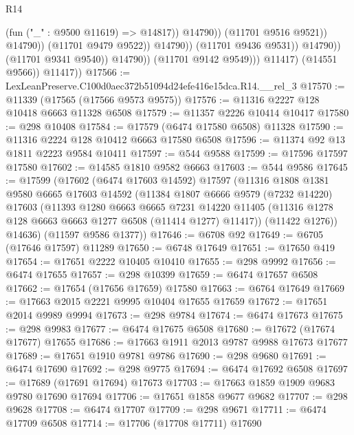 \begin{lexlean}{R14}
\begin{coremodule}
                                              (fun ("_" : @9500 @11619) => @14817))
                                            @14790))
                                        (@11701 @9516 @9521))
                                      @14790))
                                  (@11701 @9479 @9522))
                                @14790))
                            (@11701 @9436 @9531))
                          @14790))
                      (@11701 @9341 @9540))
                    @14790))
                (@11701 @9142 @9549)))
            @11417)
          (@14551 @9566))
        @11417))
@17566 := LexLeanPreserve.C100d0aec372b51094d24efe416e15dca.R14.__rel_3
@17570 := @11339 (@17565 (@17566 @9573 @9575))
@17576 := @11316 @2227 @128 @10418 @6663 @11328 @6508
@17579 := @11357 @2226 @10414 @10417
@17580 := @298 @10408
@17584 := @17579 (@6474 @17580 @6508) @11328
@17590 := @11316 @2224 @128 @10412 @6663 @17580 @6508
@17596 := @11374 @92 @13 @1811 @2223 @9584 @10411
@17597 := @544 @9588
@17599 := @17596 @17597 @17580
@17602 := @14585 @1810 @9582 @6663
@17603 := @544 @9586
@17645 := @17599
    (@17602
      (@6474 @17603 @14592)
      @17597
      (@11316
        @1808
        @1381
        @9580
        @6665
        @17603
        @14592
        (@11384
          @1807
          @6666
          @9579
          (@7232 @14220)
          @17603
          (@11393
            @1280
            @6663
            @6665
            @7231
            @14220
            @11405
            (@11316 @1278 @128 @6663 @6663 @1277 @6508 (@11414 @1277) @11417))
          (@11422 @1276))
        @14636)
      (@11597 @9586 @1377))
@17646 := @6708 @92
@17649 := @6705 (@17646 @17597) @11289
@17650 := @6748 @17649
@17651 := @17650 @419
@17654 := @17651 @2222 @10405 @10410
@17655 := @298 @9992
@17656 := @6474 @17655
@17657 := @298 @10399
@17659 := @6474 @17657 @6508
@17662 := @17654 (@17656 @17659) @17580
@17663 := @6764 @17649
@17669 := @17663 @2015 @2221 @9995 @10404 @17655 @17659
@17672 := @17651 @2014 @9989 @9994
@17673 := @298 @9784
@17674 := @6474 @17673
@17675 := @298 @9983
@17677 := @6474 @17675 @6508
@17680 := @17672 (@17674 @17677) @17655
@17686 := @17663 @1911 @2013 @9787 @9988 @17673 @17677
@17689 := @17651 @1910 @9781 @9786
@17690 := @298 @9680
@17691 := @6474 @17690
@17692 := @298 @9775
@17694 := @6474 @17692 @6508
@17697 := @17689 (@17691 @17694) @17673
@17703 := @17663 @1859 @1909 @9683 @9780 @17690 @17694
@17706 := @17651 @1858 @9677 @9682
@17707 := @298 @9628
@17708 := @6474 @17707
@17709 := @298 @9671
@17711 := @6474 @17709 @6508
@17714 := @17706 (@17708 @17711) @17690

\end{coremodule}
\end{lexlean}
